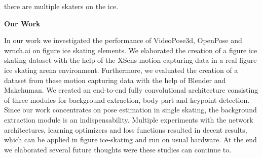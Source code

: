     there are multiple skaters on the ice.\\
\par
    \textbf{Our Work} \par
    In our work we investigated the performance of VideoPose3d, OpenPose and wrnch.ai on figure ice skating elements.
    We elaborated the creation of a figure ice skating dataset with the help of the XSens motion capturing data in a
    real figure ice skating arena
    environment.
    Furthermore, we evaluated the creation of a dataset from these motion capturing data with the help of Blender and
    Makehuman.
    We created an end-to-end fully convolutional architecture consisting of three modules for background extraction,
    body part and keypoint detection.
    Since our work concentrates on pose estimation in single skating, the background extraction module is
    an indispensability.
    Multiple experiments with the network architectures, learning optimizers and loss functions resulted in decent
    results,
    which can be applied in figure ice-skating and run on usual hardware.
    At the end we elaborated several future thoughts were these studies can continue to.




